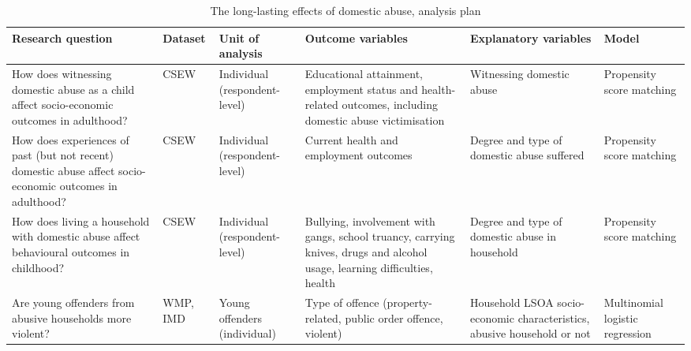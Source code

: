\documentclass[11pt, a4paper]{article}
\begin{document}
\begin{table}[!htbp]
\caption{The long-lasting effects of domestic abuse, analysis plan}
  \begin{threeparttable}[t]
  \centering
       \begin{tabular}{ L{2.8cm}  C{1.8cm}  C{1.8cm}  C{3.2cm}  C{2.8cm}  C{2cm} }
    \toprule
     \textbf{Research question} & \textbf{Dataset}    & \textbf{Unit of analysis} & \textbf{Outcome variables} & \textbf{Explanatory variables} & \textbf{Model} \\
    \midrule
    How does witnessing domestic abuse as a child affect socio-economic outcomes in adulthood? & CSEW & Individual (respondent-level) & Educational attainment, employment status and health-related outcomes, including domestic abuse victimisation & Witnessing domestic abuse & Propensity score matching \\
                \midrule
                   How does experiences of past (but not recent) domestic abuse affect socio-economic outcomes in adulthood? & CSEW & Individual (respondent-level) & Current health and employment outcomes & Degree and type of domestic abuse suffered & Propensity score matching \\
                \midrule
     How does living a household with domestic abuse affect behavioural outcomes in childhood? & CSEW & Individual (respondent-level) & Bullying, involvement with gangs, school truancy, carrying knives, drugs and alcohol usage, learning difficulties, health & Degree and type of domestic abuse in household & Propensity score matching \\
                \midrule
          Are young offenders from abusive households more violent? & WMP, IMD & Young offenders (individual) & Type of offence (property-related, public order offence, violent) & Household LSOA socio-economic characteristics, abusive household or not & Multinomial logistic regression \\
     \bottomrule
  \end{tabular}
    \end{threeparttable}%
  \label{tab:addlabel}%
\end{table}%


\end{document}

